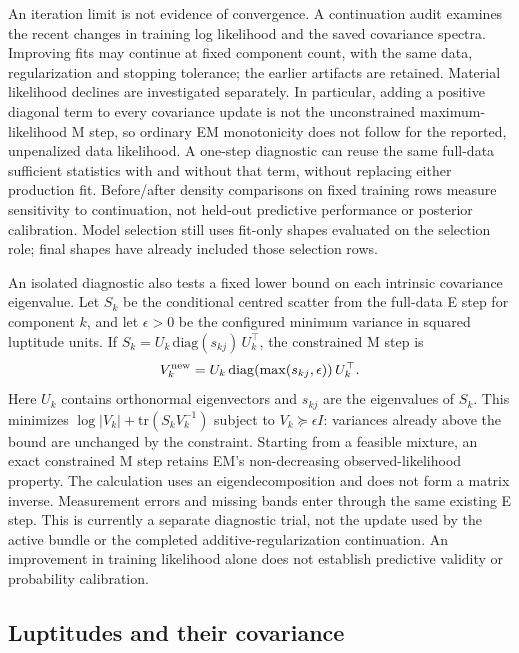 \documentclass[11pt,a4paper]{article}
\begin{document}
An iteration limit is not evidence of convergence. A continuation audit examines
the recent changes in training log likelihood and the saved covariance spectra.
Improving fits may continue at fixed component count, with the same data,
regularization and stopping tolerance; the earlier artifacts are retained.
Material likelihood declines are investigated separately. In particular, adding
a positive diagonal term to every covariance update is not the unconstrained
maximum-likelihood M step, so ordinary EM monotonicity does not follow for the
reported, unpenalized data likelihood. A one-step diagnostic can reuse the same
full-data sufficient statistics with and without that term, without replacing
either production fit. Before/after density comparisons on fixed training rows
measure sensitivity to continuation, not held-out predictive performance or
posterior calibration. Model selection still uses fit-only shapes evaluated on
the selection role; final shapes have already included those selection rows.

An isolated diagnostic also tests a fixed lower bound on each intrinsic
covariance eigenvalue. Let $S_k$ be the conditional centred scatter from the
full-data E step for component $k$, and let $\epsilon>0$ be the configured
minimum variance in squared luptitude units. If
$S_k=U_k\,\mathrm{diag}(s_{kj})\,U_k^\top$, the constrained M step is
\begin{equation}
 V_k^{\rm new}=U_k\,\mathrm{diag}\!\left(\max(s_{kj},\epsilon)\right)U_k^\top.
\end{equation}
Here $U_k$ contains orthonormal eigenvectors and $s_{kj}$ are the eigenvalues
of $S_k$. This minimizes $\log|V_k|+\mathrm{tr}(S_kV_k^{-1})$ subject to
$V_k\succeq\epsilon I$: variances already above the bound are unchanged by
the constraint. Starting from a feasible mixture, an exact constrained M step
retains EM's non-decreasing observed-likelihood property. The calculation uses
an eigendecomposition and does not form a matrix inverse. Measurement errors
and missing bands enter through the same existing E step. This is currently
a separate diagnostic trial, not the update used by the active bundle or the
completed additive-regularization continuation. An improvement in training
likelihood alone does not establish predictive validity or probability
calibration.


\subsection{Luptitudes and their covariance}
\label{sec:luptitudes}
\end{document}
